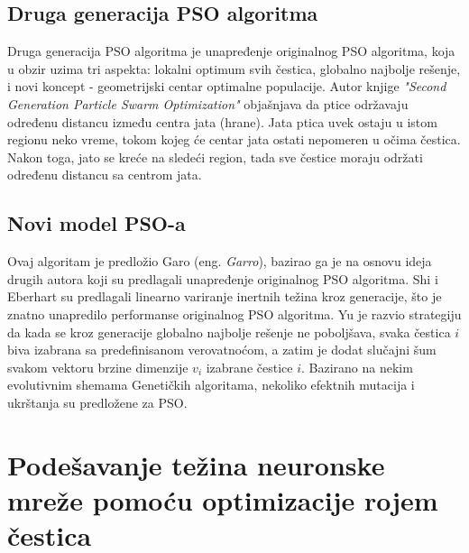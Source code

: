 \documentclass[a4paper]{article}
\begin{document}




\subsection{Druga generacija PSO algoritma}
\label{subsec:sgpso}

Druga generacija PSO algoritma je unapređenje originalnog PSO algoritma, koja u obzir uzima tri aspekta: lokalni optimum svih čestica, 
globalno najbolje rešenje, i novi koncept - geometrijski centar optimalne populacije. Autor knjige \textit{"{}Second Generation Particle Swarm Optimization"} 
objašnjava da ptice održavaju  određenu distancu između centra jata (hrane). Jata ptica uvek ostaju u istom regionu neko vreme, 
tokom kojeg će centar jata ostati nepomeren u očima čestica. Nakon toga, jato se kreće na sledeći region, tada sve čestice moraju 
održati određenu distancu sa centrom jata.

\subsection{Novi model PSO-a}
\label{subsec:nmpso}

Ovaj algoritam je predložio Garo (eng. \textit{Garro}), bazirao ga je na osnovu ideja drugih autora koji su predlagali unapređenje originalnog 
PSO algoritma. Shi i Eberhart su predlagali linearno variranje inertnih težina kroz generacije, što je znatno unapredilo performanse originalnog PSO algoritma.
Yu je razvio strategiju da kada se kroz generacije globalno najbolje rešenje ne poboljšava, svaka čestica \textit{$i$} biva izabrana sa 
predefinisanom verovatnoćom, a zatim je dodat slučajni šum svakom vektoru brzine dimenzije $v_i$ izabrane čestice \textit{$i$}. 
Bazirano na nekim evolutivnim shemama Genetičkih algoritama, nekoliko efektnih mutacija i ukrštanja su predložene za PSO.

\section{Podešavanje težina neuronske mreže pomoću optimizacije rojem čestica}
\label{sec:podesavanjetezina}
\end{document}
